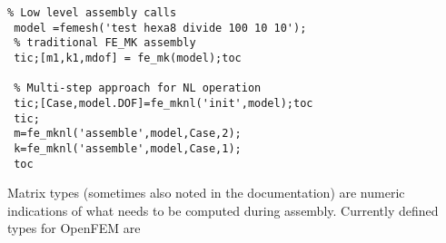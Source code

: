 \begin{verbatim}
% Low level assembly calls
 model =femesh('test hexa8 divide 100 10 10');
 % traditional FE_MK assembly
 tic;[m1,k1,mdof] = fe_mk(model);toc

 % Multi-step approach for NL operation
 tic;[Case,model.DOF]=fe_mknl('init',model);toc
 tic;
 m=fe_mknl('assemble',model,Case,2);
 k=fe_mknl('assemble',model,Case,1);
 toc
\end{verbatim}%



Matrix types (sometimes also noted  in the documentation) are numeric indications of what needs to be computed during assembly. Currently defined types for OpenFEM are

